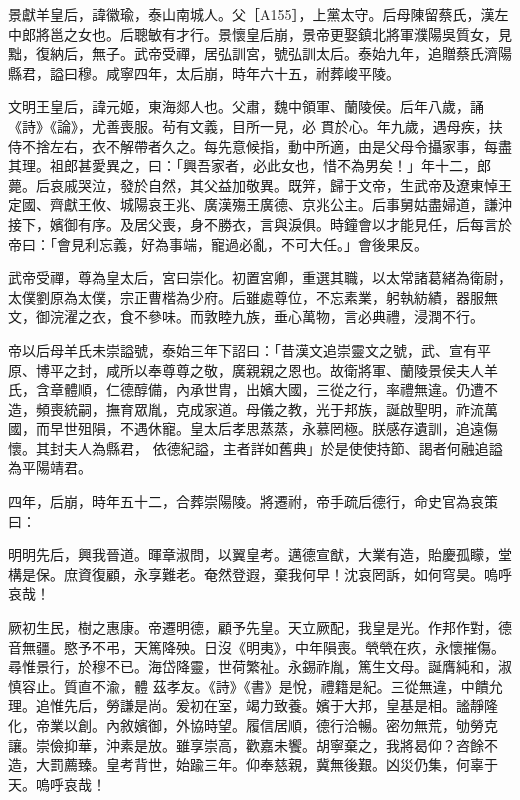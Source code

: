 \begin{pinyinscope}
 景獻羊皇后，諱徽瑜，泰山南城人。父［A155］，上黨太守。后母陳留蔡氏，漢左中郎將邕之女也。后聰敏有才行。景懷皇后崩，景帝更娶鎮北將軍濮陽吳質女，見黜，復納后，無子。武帝受禪，居弘訓宮，號弘訓太后。泰始九年，追贈蔡氏濟陽縣君，謚曰穆。咸寧四年，太后崩，時年六十五，祔葬峻平陵。



 文明王皇后，諱元姬，東海郯人也。父肅，魏中領軍、蘭陵侯。后年八歲，誦《詩》《論》，尤善喪服。茍有文義，目所一見，必
 貫於心。年九歲，遇母疾，扶侍不捨左右，衣不解帶者久之。每先意候指，動中所適，由是父母令攝家事，每盡其理。祖郎甚愛異之，曰：「興吾家者，必此女也，惜不為男矣！」年十二，郎薨。后哀戚哭泣，發於自然，其父益加敬異。既笄，歸于文帝，生武帝及遼東悼王定國、齊獻王攸、城陽哀王兆、廣漢殤王廣德、京兆公主。后事舅姑盡婦道，謙沖接下，嬪御有序。及居父喪，身不勝衣，言與淚俱。時鐘會以才能見任，后每言於帝曰：「會見利忘義，好為事端，寵過必亂，不可大任。」會後果反。



 武帝受禪，尊為皇太后，宮曰崇化。初置宮卿，重選其職，以太常諸葛緒為衛尉，
 太僕劉原為太僕，宗正曹楷為少府。后雖處尊位，不忘素業，躬執紡績，器服無文，御浣濯之衣，食不參味。而敦睦九族，垂心萬物，言必典禮，浸潤不行。



 帝以后母羊氏未崇謚號，泰始三年下詔曰：「昔漢文追崇靈文之號，武、宣有平原、博平之封，咸所以奉尊尊之敬，廣親親之恩也。故衛將軍、蘭陵景侯夫人羊氏，含章體順，仁德醇備，內承世胄，出嬪大國，三從之行，率禮無違。仍遭不造，頻喪統嗣，撫育眾胤，克成家道。母儀之教，光于邦族，誕啟聖明，祚流萬國，而早世殂隕，不遇休寵。皇太后孝思蒸蒸，永慕罔極。朕感存遺訓，追遠傷懷。其封夫人為縣君，
 依德紀謚，主者詳如舊典」於是使使持節、謁者何融追謚為平陽靖君。



 四年，后崩，時年五十二，合葬崇陽陵。將遷祔，帝手疏后德行，命史官為哀策曰：



 明明先后，興我晉道。暉章淑問，以翼皇考。邁德宣猷，大業有造，貽慶孤矇，堂構是保。庶資復顧，永享難老。奄然登遐，棄我何早！沈哀罔訴，如何穹昊。嗚呼哀哉！



 厥初生民，樹之惠康。帝遷明德，顧予先皇。天立厥配，我皇是光。作邦作對，德音無疆。愍予不弔，天篤降殃。日沒《明夷》，中年隕喪。煢煢在疚，永懷摧傷。尋惟景行，於穆不已。海岱降靈，世荷繁祉。永錫祚胤，篤生文母。誕膺純和，淑慎容止。質直不渝，體
 茲孝友。《詩》《書》是悅，禮籍是紀。三從無違，中饋允理。追惟先后，勞謙是尚。爰初在室，竭力致養。嬪于大邦，皇基是相。謐靜隆化，帝業以創。內敘嬪御，外協時望。履信居順，德行洽暢。密勿無荒，劬勞克讓。崇儉抑華，沖素是放。雖享崇高，歡嘉未饗。胡寧棄之，我將曷仰？咨餘不造，大罰薦臻。皇考背世，始踰三年。仰奉慈親，冀無後艱。凶災仍集，何辜于天。嗚呼哀哉！




\end{pinyinscope}
